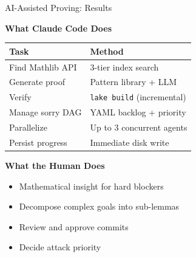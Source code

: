 \documentclass[aspectratio=169, 10pt]{beamer}
\begin{document}
\begin{frame}{AI-Assisted Proving: Results}

\begin{center}
\textbf{What Claude Code Does}

\vspace{0.3em}
\begin{tabular}{ll}
  \toprule
  \textbf{Task} & \textbf{Method} \\
  \midrule
  Find Mathlib API  & 3-tier index search \\
  Generate proof    & Pattern library + LLM \\
  Verify            & \texttt{lake build} (incremental) \\
  Manage sorry DAG  & YAML backlog + priority \\
  Parallelize       & Up to 3 concurrent agents \\
  Persist progress  & Immediate disk write \\
  \bottomrule
\end{tabular}
\end{center}

\vspace{0.5em}
\begin{center}
\textbf{What the Human Does}

\vspace{0.3em}
\begin{itemize}
  \centering
  \item Mathematical insight for hard blockers
  \item Decompose complex goals into sub-lemmas
  \item Review and approve commits
  \item Decide attack priority
\end{itemize}
\end{center}

\end{frame}
\end{document}
